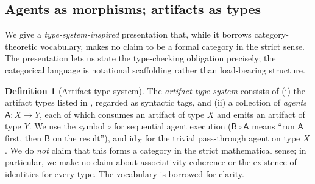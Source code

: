 \documentclass[12pt]{article}
\theoremstyle{definition}
\newtheorem{definition}[theorem]{Definition}
\theoremstyle{remark}
\newcommand{\Agent}[1]{\ensuremath{\mathsf{#1}}}
\begin{document}
\subsection{Agents as morphisms; artifacts as types}
\label{sec:morphisms}

We give a \emph{type-system-inspired} presentation that, while it
borrows category-theoretic vocabulary, makes no claim to be a formal
category in the strict sense. The presentation lets us state the
type-checking obligation precisely; the categorical language is
notational scaffolding rather than load-bearing structure.

\begin{definition}[Artifact type system]
\label{def:artifact-cat}
The \emph{artifact type system} consists of (i) the artifact types
listed in , regarded as syntactic tags, and
(ii) a collection of \emph{agents} \(\Agent{A} : X \to Y\), each of
which consumes an artifact of type \(X\) and emits an artifact of type
\(Y\). We use the symbol \(\circ\) for sequential agent execution
(\(\Agent{B} \circ \Agent{A}\) means ``run \(\Agent{A}\) first, then
\(\Agent{B}\) on the result''), and \(\mathrm{id}_X\) for the trivial
pass-through agent on type \(X\). We do \emph{not} claim that this
forms a category in the strict mathematical sense; in particular, we
make no claim about associativity coherence or the existence of
identities for every type. The vocabulary is borrowed for clarity.
\end{definition}
\end{document}

